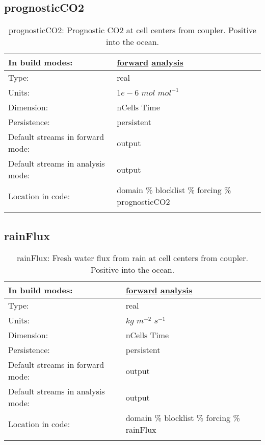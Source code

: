\subsection[prognosticCO2]{prognosticCO2}
\label{subsec:var_sec_forcing_prognosticCO2}
\begin{center}
\begin{longtable}{| p{2.0in} | p{4.0in} |}
        \hline 
        In build modes: & \hyperref[subsec:forward_var_tab_forcing]{forward} \hyperref[subsec:analysis_var_tab_forcing]{analysis} \\
        \hline 
        Type: & real \\
        \hline 
        Units: & $1e-6$ $mol$ $mol^{-1}$ \\
        \hline 
        Dimension: & nCells Time \\
        \hline 
        Persistence: & persistent \\
        \hline 
		 Default streams in forward mode: &  output \\
        \hline 
		 Default streams in analysis mode: &  output \\
        \hline 
		 Location in code: & domain \% blocklist \% forcing \% prognosticCO2 \\
		 \hline 
    \caption{prognosticCO2: Prognostic CO2 at cell centers from coupler. Positive into the ocean.}
\end{longtable}
\end{center}
\subsection[rainFlux]{rainFlux}
\label{subsec:var_sec_forcing_rainFlux}
\begin{center}
\begin{longtable}{| p{2.0in} | p{4.0in} |}
        \hline 
        In build modes: & \hyperref[subsec:forward_var_tab_forcing]{forward} \hyperref[subsec:analysis_var_tab_forcing]{analysis} \\
        \hline 
        Type: & real \\
        \hline 
        Units: & $kg$ $m^{-2}$ $s^{-1}$ \\
        \hline 
        Dimension: & nCells Time \\
        \hline 
        Persistence: & persistent \\
        \hline 
		 Default streams in forward mode: &  output \\
        \hline 
		 Default streams in analysis mode: &  output \\
        \hline 
		 Location in code: & domain \% blocklist \% forcing \% rainFlux \\
		 \hline 
    \caption{rainFlux: Fresh water flux from rain at cell centers from coupler. Positive into the ocean.}
\end{longtable}
\end{center}
